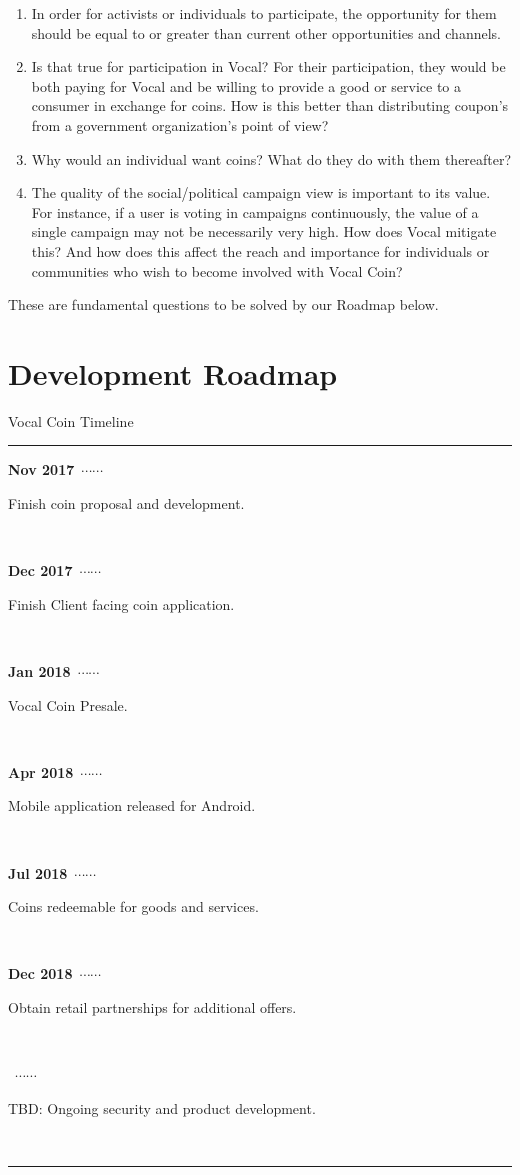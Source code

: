 \documentclass[conference]{IEEEtran}
\begin{document}
    \begin{enumerate}
      \item In order for activists or individuals to participate, the opportunity for them should be equal to or greater than current other opportunities and channels.
      \item Is that true for participation in Vocal? For their participation, they would be both paying for Vocal and be willing to provide a good or service to a consumer in exchange for coins. How is this better than distributing coupon’s from a government organization’s point of view?
      \item Why would an individual want coins? What do they do with them thereafter?
      \item The quality of the social/political campaign view is important to its value. For instance, if a user is voting in campaigns continuously, the value of a single campaign may not be necessarily very high. How does Vocal mitigate this? And how does this affect the reach and importance for individuals or communities who wish to become involved with Vocal Coin?
    \end{enumerate}

    These are fundamental questions to be solved by our Roadmap below.
    
    \section{Development Roadmap}



    \newcommand\ytl[2]{
    \parbox[b]{8em}{\hfill{\color{cyan}\bfseries\sffamily #1}~$\cdots\cdots$~}\makebox[0pt][c]{$\bullet$}\vrule\quad \parbox[c]{3cm}{\vspace{7pt}\color{red!40!black!80}\raggedright\sffamily #2.\\[7pt]}\\[-3pt]}
    \begin{table}
    \caption{Vocal Coin Timeline}
    \centering
    \begin{minipage}[t]{\linewidth}
    \color{gray}
    \rule{\linewidth}{1pt}
    \ytl{Nov 2017}{Finish coin proposal and development}
    \ytl{Dec 2017}{Finish Client facing coin application}
    \ytl{Jan 2018}{Vocal Coin Presale}
    \ytl{Apr 2018}{Mobile application released for Android}
    \ytl{Jul 2018}{Coins redeemable for goods and services}
    \ytl{Dec 2018}{Obtain retail partnerships for additional offers}
    \ytl{2019}{TBD: Ongoing security and product development}
    \bigskip
    \rule{\linewidth}{1pt}%
    \end{minipage}%
    \end{table}
\end{document}
